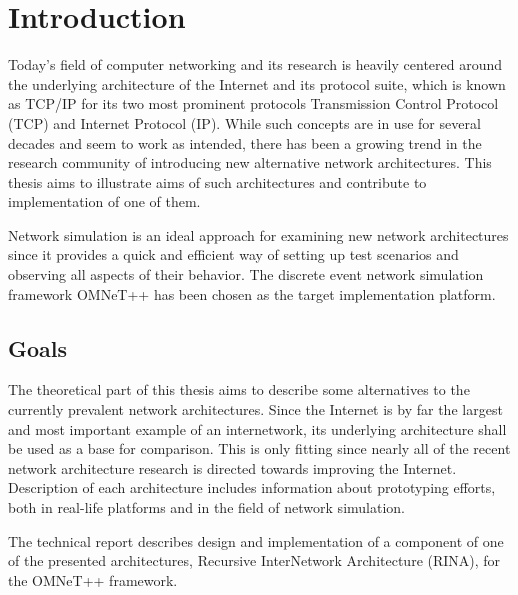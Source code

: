 

\chapter{Introduction}\label{intro}

    Today's field of computer networking and its research is heavily centered around the underlying architecture of the Internet and its protocol suite, which is known as TCP/IP for its two most prominent protocols Transmission Control Protocol (TCP) and Internet Protocol (IP). While such concepts are in use for several decades and seem to work as intended, there has been a growing trend in the research community of introducing new alternative network architectures. This thesis aims to illustrate aims of such architectures and contribute to implementation of one of them.

    Network simulation is an ideal approach for examining new network architectures since it provides a quick and efficient way of setting up test scenarios and observing all aspects of their behavior. The discrete event network simulation framework OMNeT++ has been chosen as the target implementation platform.

    \section{Goals}

        The theoretical part of this thesis aims to describe some alternatives to the currently prevalent network architectures. Since the Internet is by far the largest and most important example of an internetwork, its underlying architecture shall be used as a base for comparison. This is only fitting since nearly all of the recent network architecture research is directed towards improving the Internet. Description of each architecture includes information about prototyping efforts, both in real-life platforms and in the field of network simulation.

        The technical report describes design and implementation of a component of one of the presented architectures, Recursive InterNetwork Architecture (RINA), for the OMNeT++ framework.

